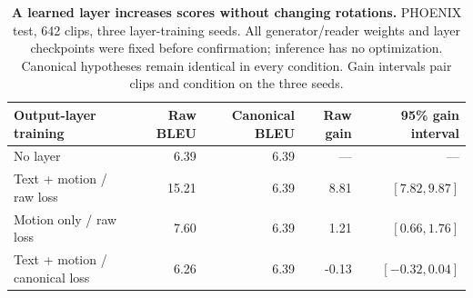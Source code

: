 \begin{table}[t]
\centering
\caption{\textbf{A learned layer increases scores without changing rotations.} PHOENIX test, 642 clips, three layer-training seeds. All generator/reader weights and layer checkpoints were fixed before confirmation; inference has no optimization. Canonical hypotheses remain identical in every condition. Gain intervals pair clips and condition on the three seeds.}
\label{tab:learned}
\begin{tabular}{lrrrr}\toprule
Output-layer training&Raw BLEU&Canonical BLEU&Raw gain&95\% gain interval\\\midrule
No layer&6.39&6.39&---&---\\
Text + motion / raw loss&15.21&6.39&8.81&$[7.82,9.87]$\\
Motion only / raw loss&7.60&6.39&1.21&$[0.66,1.76]$\\
Text + motion / canonical loss&6.26&6.39&-0.13&$[-0.32,0.04]$\\
\bottomrule\end{tabular}\end{table}
